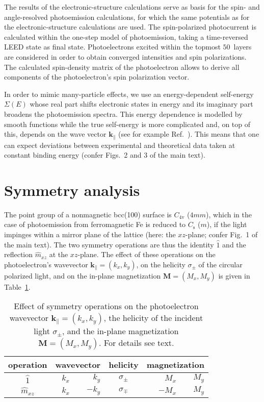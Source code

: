 \documentclass[amsfonts, amssymb, amsmath, preprint, showkeys, twoside, prl, superscriptaddress, aps]{revtex4-2}
\renewcommand{\vec}[1]{\boldsymbol{#1}}
\begin{document}
The results of the electronic-structure calculations serve as basis for the spin- and angle-resolved photoemission calculations, for which the same potentials as for the electronic-structure calculations are used. The spin-polarized photocurrent is calculated within the one-step model of photoemission, taking a time-reversed LEED state as final state. Photoelectrons excited within the topmost $50$~layers are considered in order to obtain converged intensities and spin polarizations. The calculated spin-density matrix of the photoelectron allows to derive all components of the photoelectron's spin polarization vector. 

In order to mimic many-particle effects, we use an energy-dependent self-energy $\Sigma(E)$ whose real part shifts electronic states in energy and its imaginary part broadens the photoemission spectra. This energy dependence is modelled by smooth functions while the true self-energy is more complicated and, on top of this, depends on the wave vector $\vec{k}_{\parallel}$ (see for example Ref.~). This means that one can expect deviations between experimental and theoretical data taken at constant binding energy (confer Figs.~2 and 3 of the main text).

\section{Symmetry analysis}
The point group of a nonmagnetic bcc(100) surface is $C_{4\mathrm{v}}$ ($4mm$), which in the case of photoemission from ferromagnetic Fe is reduced to $C_{\mathrm{s}}$ ($m$), if the light impinges within a mirror plane of the lattice (here: the $xz$-plane; confer Fig.~1 of the main text). The two symmetry operations are thus the identity $\hat{1}$ and the reflection $\hat{m}_{xz}$ at the $xz$-plane. The effect of these operations on the photoelectron's wavevector $\vec{k}_{\parallel} = (k_{x}, k_{y})$, on the helicity $\sigma_{\pm}$ of the circular polarized light, and on the in-plane magnetization $\vec{M} = (M_{x}, M_{y})$ is given in Table~\ref{tab:symmetry}.

\begin{table}
    \centering
    \caption{Effect of symmetry operations on the photoelectron wavevector $\vec{k}_{\parallel} = (k_{x}, k_{y})$, the helicity of the incident light $\sigma_{\pm}$, and the in-plane magnetization $\vec{M} = (M_{x}, M_{y})$. For details see text.}
    \label{tab:symmetry}
    \begin{tabular}{c|rrcrr}
     \hline \hline
        \multicolumn{1}{c|}{operation} & 
        \multicolumn{2}{c}{wavevector} & 
        \multicolumn{1}{c}{helicity} &  
        \multicolumn{2}{c}{magnetization} \\ \hline
        $\hat{1}$      & $k_{x}$ & $k_{y}$  & $\sigma_{\pm}$ & $M_{x}$ & $M_{y}$ \\
        $\hat{m}_{xz}$ & $k_{x}$ & $-k_{y}$ & $\sigma_{\mp}$ &  $-M_{x}$ & $M_{y}$ \\
     \hline \hline
    \end{tabular}
\end{table}
\end{document}
